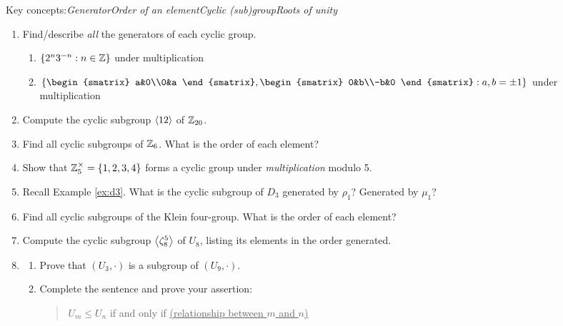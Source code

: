 \begin{exercises}
	Key concepts:\quad \emph{Generator\quad Order of an element\quad Cyclic (sub)group\quad Roots of unity}
	
	\begin{enumerate}	  
		\item Find/describe \emph{all} the generators of each cyclic group.
	  \begin{enumerate}
	      \item {}
	      $\{2^n3^{-n}:n\in\mathbb{Z}\}$ under multiplication
	      \setcounter{enumi}{2}
	      \item {}
	      $\left\{\begin{smatrix} a&0\\0&a \end{smatrix},\begin{smatrix} 0&b\\-b&0 \end{smatrix}: a,b=\pm 1\right\}$ under multiplication
	  \end{enumerate}
	  
	  
	  \item Compute the cyclic subgroup $\left\langle 12\right\rangle$ of $\mathbb{Z}_{20}$.
	  
	  
	  \item Find all cyclic subgroups of $\mathbb{Z}_6$. What is the order of each element?
	  
	  
	  \item\label{exs:z5times2} Show that $\mathbb{Z}_5^\times=\{1,2,3,4\}$ forms a cyclic group under \emph{multiplication} modulo 5.
	
	
	  \item Recall Example \ref{ex:d3}. What is the cyclic subgroup of $D_3$ generated by $\rho_1$? Generated by $\mu_1$?
	  
	  
	  \item Find all cyclic subgroups of the Klein four-group. What is the order of each element?
	  
	  
	  \item Compute the cyclic subgroup $\left\langle \zeta_8^5\right\rangle$ of $U_8$, listing its elements in the order generated. 
	  	  
	  
		\item\begin{enumerate}
		  \item Prove that $(U_3,\cdot)$ is a subgroup of $(U_9,\cdot)$.
		  \item Complete the sentence and prove your assertion:
		  \begin{quote}
		  	$U_m\le U_n$ if and only if \underline{\qquad\scriptsize(relationship between $m$ and $n$)\qquad}
		  \end{quote}
		\end{enumerate}
	    	

\end{enumerate}
\end{exercises}

